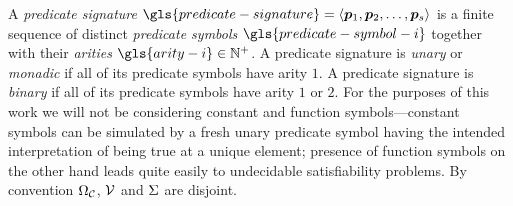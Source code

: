 
A \emph{predicate signature} 
$\gls{predicate-signature} = \seq{\pp1, \pp2, \dots, \pp\sizes}$ is a finite 
sequence of distinct \emph{predicate symbols} $\gls{predicate-symbol-i}$
together with their \emph{arities} $\gls{arity-i} \in \pNats$.
A predicate signature is \emph{unary} or \emph{monadic} if all of its predicate
symbols have arity $1$.
A predicate signature is \emph{binary} if all of its predicate
symbols have arity $1$ or $2$.
For the purposes of this work we will not be considering constant and function
symbols---constant symbols can be simulated by a fresh unary predicate
symbol having the intended interpretation of being true at a unique element;
presence of function symbols on the other hand leads quite easily to undecidable
satisfiability problems.
By convention $\Omega_{\mathcal{C}}$, $\mathcal{V}$ and $\mathrm{\Sigma}$ are disjoint.